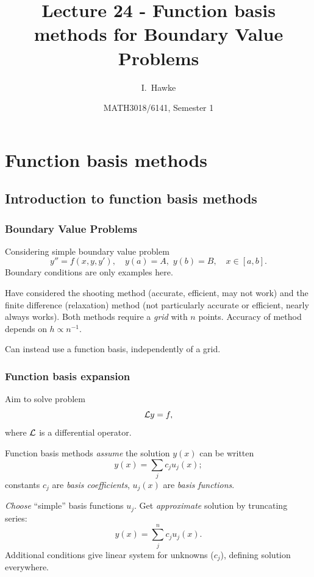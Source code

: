 \documentclass{beamer}
\title[Lecture 24] %
{Lecture 24 - Function basis methods for Boundary Value Problems}
\author[I. Hawke] %
{I.~Hawke}
\institute[University of Southampton] %
{
  School of Mathematics, \\
  University of Southampton, UK
}
\date[Semester 1] %
{MATH3018/6141, Semester 1}
\begin{document}
\begin{frame}
  \titlepage
\end{frame}

\section{Function basis methods}

\subsection{Introduction to function basis methods}

\begin{frame}
  \frametitle{Boundary Value Problems}

  Considering simple boundary value problem
  \begin{equation*}
    y'' = f(x, y, y'), \quad y(a) = A, \,\, y(b) = B, \quad x \in [a,b].
  \end{equation*} \pause
  Boundary conditions are only examples here. \pause

  \vspace{1ex}

  Have considered the shooting method (accurate, efficient, may not
  work) and the finite difference (relaxation) method (not
  particularly accurate or efficient, nearly always works). \pause
  Both methods require a \emph{grid} with $n$ points. Accuracy of
  method depends on $h \propto n^{-1}$. \pause

  \vspace{1ex}

  Can instead use a function basis, independently of a grid.

\end{frame}

\begin{frame}
  \frametitle{Function basis expansion}

  Aim to solve problem
  \begin{equation*}
    {\cal L} y = f,
  \end{equation*}
  where ${\cal L}$ is a differential operator. \pause

  \vspace{1ex}

  Function basis methods \emph{assume} the solution $y(x)$ can be
  written
  \begin{equation*}
    y(x) = \sum_{j} c_j u_j (x);
  \end{equation*}
  constants $c_j$ are \emph{basis coefficients}, $u_j(x)$ are
  \emph{basis functions}. \pause

  \vspace{1ex}

  \emph{Choose} ``simple'' basis functions $u_j$. Get
  \emph{approximate} solution by truncating series:
  \begin{equation*}
    y(x) = \sum_{j}^n c_j u_j (x).
  \end{equation*} \pause
  Additional conditions give linear system for unknowns ($c_j$),
  defining solution everywhere.

\end{frame}
\end{document}
